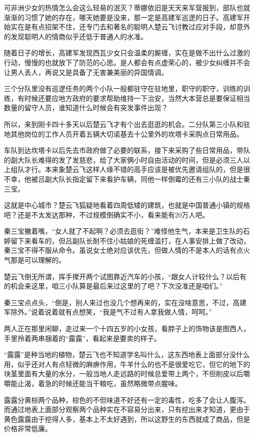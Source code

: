 可非洲少女的热情怎么会这么轻易的泯灭？蒂娜依旧是天天来军营报到，部队也就渐渐的习惯了她的存在，哪天她要是没来，那一定是高建军巡逻的日子。高建军开始实在是有点招架不住，还专门去和著名的聪明人楚云飞讨教过应对手段，却意外的发现聪明人的情商似乎还低于普通人的水准。

随着日子的增长，高建军发现西瓦少女只会温柔的厮缠，实在是做不出什么过激的行动，慢慢的也就放下了防范的心思。是人都会有点虚荣心的，被少女纠缠并不会让男人丢人，再说又是具备了无害兼美丽的异国情调。

三个分队里没有巡逻任务的两个小队一般都驻守在驻地里，职守的职守，训练的训练，有时候还要应地方政府的要求帮助维持一下治安，当然大本营总是要保证相当数量的留守人员，谁知道什么时候会有突发事件出现？

所以，来到刚卡四十多天以后楚云飞才有个出去逛逛的机会。二分队第三小队和驻地其他岗位的工作人员开着五辆大切诺基去十公里外的坎塔卡采购点日常用品。

车队到达坎塔卡以后先去市政府做了必要的联系，接下来采购了些日常用品，带队的副大队长难得的发了发慈悲，给了大家俩小时自由活动的时间，但是必须三人以上组队才行。本来象楚云飞这样人缘不错的高手应该是被优先邀请组队的，但是很不幸，他被吕副大队长指定留下来看护车辆，同他一样倒霉的还有三小队的战士秦三宝。

这就是中心城市？楚云飞狐疑地看着四周低矮的建筑，也就是中国普通小镇的规格吧？还是不太发达那种，不过规模倒确实不小，看来能有20万人吧。

秦三宝撇着嘴，“女人就了不起啊？必须去逛街？”难怪他生气，本来是卫生队的石婷留下来看车的，但吕副队长耐不住小姑娘的死缠滥打，在人事安排上做了改动，秦三宝不得不服从命令。虽说女士绝对应该优先，但做人情的不是本人的话有点火气那是可以理解的。

楚云飞倒无所谓，挥手撵开两个试图靠近汽车的小孩，“跟女人计较什么？以后有的机会来这里，咱三小队算是最后来过这里的了吧？下次没准还是咱们。”

秦三宝点点头，“倒是，别人来过也没几个想再来的，实在没啥意思，不过，高建军除外。”说着说着就有点想笑，“我是气不过有人拿我做人情，呵呵。”

两人正在那里闲聊，走过来一个十四五岁的小女孩，看脖子上的饰物该是图西人，手里拎着两串捆着的“露露”，看起来是要卖的样子。

“露露”是种当地的植物，楚云飞也不知道学名叫什么，这东西地表上面部分没什么用，似乎还对人有点轻微的麻痹作用，牛羊什么的也不是很爱吃它，但它的地下的块茎里面有大量的水分，一般当地人走远路的时候总爱带上两个，不但削皮以后嚼嚼能止渴，着急的时候还能当干粮吃，虽然略微带点腥味。

露露分黄棕两个品种，棕色的不但味道不好还有一定的毒性，吃多了会让人腹泻。而通过地表上面部分观察两个品种实在不容易分出来，只有挖出来才知道，更由于黄色露露由于挖得人多，基本上不太好遇到，所以这野生的东西就成了商品，但是价格非常低廉。

